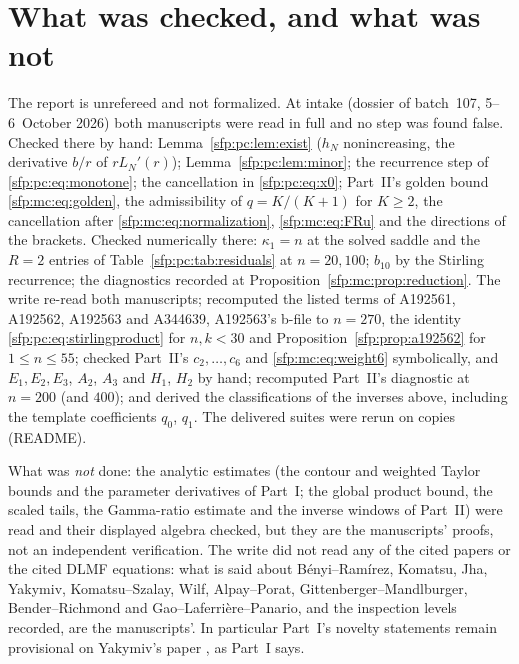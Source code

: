 \documentclass[11pt,letterpaper]{article}
\numberwithin{equation}{section}
\theoremstyle{definition}\newtheorem{definition}[theorem]{Definition}
\theoremstyle{remark}\newtheorem{remark}[theorem]{Remark}
\begin{document}
\section*{What was checked, and what was not}\label{sfp:sec:trust}
The report is unrefereed and not formalized. At intake (dossier of batch~107, 5--6~October 2026) both manuscripts were read in full and no step was found false. Checked there by hand: Lemma~\ref{sfp:pc:lem:exist} ($h_N$ nonincreasing, the derivative $b/r$ of $rL_N'(r)$); Lemma~\ref{sfp:pc:lem:minor}; the recurrence step of \eqref{sfp:pc:eq:monotone}; the cancellation in \eqref{sfp:pc:eq:x0}; Part~II's golden bound \eqref{sfp:mc:eq:golden}, the admissibility of $q=K/(K+1)$ for $K\ge2$, the cancellation after \eqref{sfp:mc:eq:normalization}, \eqref{sfp:mc:eq:FRu} and the directions of the brackets. Checked numerically there: $\kappa_1=n$ at the solved saddle and the $R=2$ entries of Table~\ref{sfp:pc:tab:residuals} at $n=20,100$; $b_{10}$ by the Stirling recurrence; the diagnostics recorded at Proposition~\ref{sfp:mc:prop:reduction}. The write re-read both manuscripts; recomputed the listed terms of A192561, A192562, A192563 and A344639, A192563's b-file to $n=270$, the identity \eqref{sfp:pc:eq:stirlingproduct} for $n,k<30$ and Proposition~\ref{sfp:prop:a192562} for $1\le n\le55$; checked Part~II's $c_2,\dots,c_6$ and \eqref{sfp:mc:eq:weight6} symbolically, and $E_1,E_2,E_3$, $A_2$, $A_3$ and $H_1$, $H_2$ by hand; recomputed Part~II's diagnostic at $n=200$ (and $400$); and derived the classifications of the inverses above, including the template coefficients $q_0$, $q_1$. The delivered suites were rerun on copies (README).

What was \emph{not} done: the analytic estimates (the contour and weighted Taylor bounds and the parameter derivatives of Part~I; the global product bound, the scaled tails, the Gamma-ratio estimate and the inverse windows of Part~II) were read and their displayed algebra checked, but they are the manuscripts' proofs, not an independent verification. The write did not read any of the cited papers or the cited DLMF equations: what is said about B\'enyi--Ram\'irez, Komatsu, Jha, Yakymiv, Komatsu--Szalay, Wilf, Alpay--Porat, Gittenberger--Mandlburger, Bender--Richmond and Gao--Laferri\`ere--Panario, and the inspection levels recorded, are the manuscripts'. In particular Part~I's novelty statements remain provisional on Yakymiv's paper \cite{yakymiv}, as Part~I says.
\end{document}
